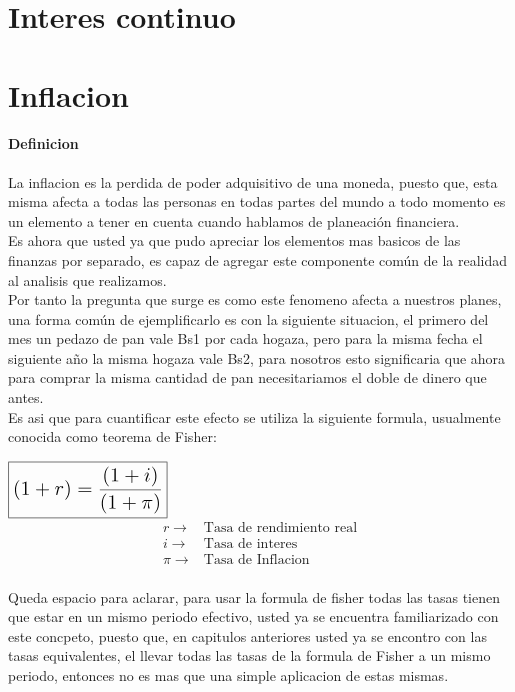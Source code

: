 \section{Interes continuo}

\section{Inflacion}
\paragraph{Definicion} La inflacion es la perdida de poder adquisitivo de una moneda, puesto que, 
esta misma afecta a todas las personas en todas partes del mundo a todo momento es un elemento a tener en cuenta cuando hablamos de planeación financiera.\\
Es ahora que usted ya que pudo apreciar los elementos mas basicos de las finanzas por separado, es capaz de 
agregar este componente común de la realidad al analisis que realizamos.\\

Por tanto la pregunta que surge es como este fenomeno afecta a nuestros planes, una forma común de ejemplificarlo es con la siguiente situacion, 
el primero del mes un pedazo de pan vale Bs1 por cada hogaza, pero para la misma fecha el siguiente año la misma hogaza vale Bs2, 
para nosotros esto significaria que ahora para comprar la misma cantidad de pan necesitariamos el doble de dinero que antes.\\

Es asi que para cuantificar este efecto se utiliza la siguiente formula, usualmente conocida como teorema de Fisher:
\begin{center}
    $\Large{\boxed{(1+r)=\frac{(1+i)}{(1+\pi)}}}$ 
    \begin{align*}
        r \rightarrow   &\text{Tasa de rendimiento real}\\
        i \rightarrow   &\text{Tasa de interes}\\
        \pi \rightarrow &\text{Tasa de Inflacion}\\
    \end{align*}
\end{center}
Queda espacio para aclarar, para usar la formula de fisher todas las tasas tienen que estar en un mismo 
periodo efectivo, usted ya se encuentra familiarizado con este concpeto, puesto que, en capitulos anteriores 
usted ya se encontro con las tasas equivalentes, el llevar todas las tasas de la formula de Fisher a un mismo 
periodo, entonces no es mas que una simple aplicacion de estas mismas.\\

